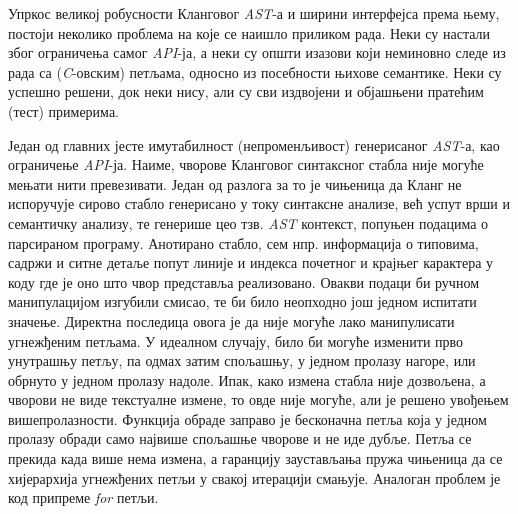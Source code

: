 \documentclass[a4paper]{article}
\begin{document}
Упркос великој робусности Кланговог \textit{AST}-а и ширини интерфејса према њему, постоји неколико проблема на које се наишло приликом рада. Неки су настали због ограничења самог \textit{API}-ја, а неки су општи изазови који неминовно следе из рада са (\textit{C}-овским) петљама, односно из посебности њихове семантике. Неки су успешно решени, док неки нису, али су сви издвојени и објашњени пратећим (тест) примерима.

Један од главних јесте имутабилност (непроменљивост) генерисаног \textit{AST}-а, као ограничење \textit{API}-ја. Наиме, чворове Кланговог синтаксног стабла није могуће мењати нити превезивати. Један од разлога за то је чињеница да Кланг не испоручује сирово стабло генерисано у току синтаксне анализе, већ успут врши и семантичку анализу, те генерише цео тзв. \textit{AST} контекст, попуњен подацима о парсираном програму. Анотирано стабло, сем нпр. информација о типовима, садржи и ситне детаље попут линије и индекса почетног и крајњег карактера у коду где је оно што чвор представља реализовано. Овакви подаци би ручном манипулацијом изгубили смисао, те би било неопходно још једном испитати значење. Директна последица овога је да није могуће лако манипулисати угнежђеним петљама. У идеалном случају, било би могуће изменити прво унутрашњу петљу, па одмах затим спољашњу, у једном пролазу нагоре, или обрнуто у једном пролазу надоле. Ипак, како измена стабла није дозвољена, а чворови не виде текстуалне измене, то овде није могуће, али је решено увођењем вишепролазности. Функција обраде заправо је бесконачна петља која у једном пролазу обради само највише спољашње чворове и не иде дубље. Петља се прекида када више нема измена, а гаранцију заустављања пружа чињеница да се хијерархија угнежђених петљи у свакој итерацији смањује. Аналоган проблем је код припреме \textit{for} петљи.
\end{document}
